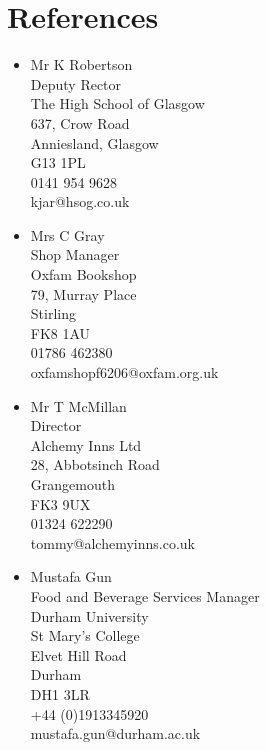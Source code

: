 \documentclass[10pt, a4paper]{article}
\begin{document}
\section{References}
	\begin{multicols}{2}
		\begin{itemize}
			\item Mr K Robertson \\ 
			      Deputy Rector \\ 
			      The High School of Glasgow \\ 
			      637, Crow Road \\ 
			      Anniesland, Glasgow \\ 
			      G13 1PL \\ 
			      0141 954 9628	\\ 
			      kjar@hsog.co.uk
			\item Mrs C Gray \\ 
			      Shop Manager \\ 
			      Oxfam Bookshop \\ 
			      79, Murray Place \\ 
			      Stirling \\ 
			      FK8 1AU \\ 
			      01786 462380 \\ 
			      oxfamshopf6206@oxfam.org.uk
			\item Mr T McMillan \\ 
			      Director \\ 
			      Alchemy Inns Ltd \\ 
			      28, Abbotsinch Road \\ 
			      Grangemouth \\ 
			      FK3 9UX \\ 
			      01324 622290 \\
			      tommy@alchemyinns.co.uk
			\item Mustafa Gun \\ 
			      Food and Beverage Services Manager \\ 
			      Durham University \\ 
			      St Mary's College \\ 
			      Elvet Hill Road \\ 
			      Durham \\ 
			      DH1 3LR \\ 
			      +44 (0)1913345920 \\ 
			      mustafa.gun@durham.ac.uk
		\end{itemize}
	\end{multicols}
\end{document}

